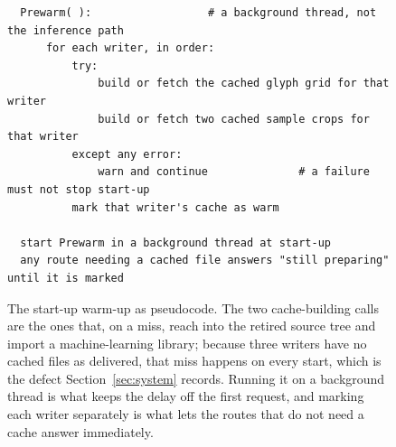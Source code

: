 \begin{figure}[!htbp]
\centering
\fontsize{8.5}{10.2}\selectfont
\begin{verbatim}
  Prewarm( ):                  # a background thread, not the inference path
      for each writer, in order:
          try:
              build or fetch the cached glyph grid for that writer
              build or fetch two cached sample crops for that writer
          except any error:
              warn and continue              # a failure must not stop start-up
          mark that writer's cache as warm

  start Prewarm in a background thread at start-up
  any route needing a cached file answers "still preparing" until it is marked
\end{verbatim}
\caption{The start-up warm-up as pseudocode. The two cache-building calls are the ones that, on a miss, reach into the retired source tree and import a machine-learning library; because three writers have no cached files as delivered, that miss happens on every start, which is the defect Section~\ref{sec:system} records. Running it on a background thread is what keeps the delay off the first request, and marking each writer separately is what lets the routes that do not need a cache answer immediately.}
\label{fig:sys-code-warm}
\end{figure}
